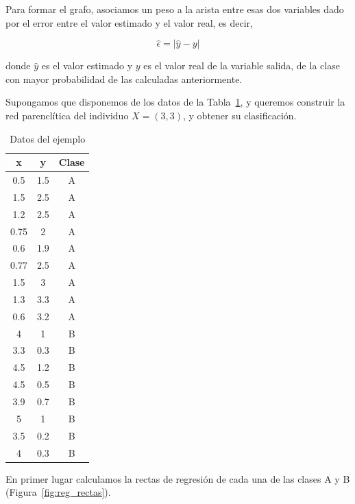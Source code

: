 Para formar el grafo, asociamos un peso a la arista entre esas dos variables dado por el error entre el valor estimado y el valor real, es decir,

\begin{equation}
\hat{\epsilon} = |\hat{y} - y|
\end{equation} 

donde $\hat{y}$ es el valor estimado y $y$ es el valor real de la variable salida, de la clase con mayor probabilidad de las calculadas anteriormente.\\

\begin{ejemplo}
	Supongamos que disponemos de los datos de la Tabla~\ref{tbl:ejemploredparenclitica}, y queremos construir la red parenclítica del individuo $X = (3,3)$, y obtener su clasificación.\\
	
	\begin{table}[htbp!]
		\centering
		\caption{Datos del ejemplo}
		\label{tbl:ejemploredparenclitica}
		\begin{tabular}{@{}ccc@{}}
			\toprule
			x    & y   & Clase \\ \midrule
			0.5  & 1.5 & A     \\
			1.5  & 2.5 & A     \\
			1.2  & 2.5 & A     \\
			0.75 & 2   & A     \\
			0.6  & 1.9 & A     \\
			0.77 & 2.5 & A     \\
			1.5  & 3   & A     \\
			1.3  & 3.3 & A     \\
			0.6  & 3.2 & A     \\
			4    & 1   & B     \\
			3.3  & 0.3 & B     \\
			4.5  & 1.2 & B     \\
			4.5  & 0.5 & B     \\
			3.9  & 0.7 & B     \\
			5    & 1   & B     \\
			3.5  & 0.2 & B     \\
			4    & 0.3 & B     \\ \bottomrule
		\end{tabular}
	\end{table}
	
	En primer lugar calculamos la rectas de regresión de cada una de las clases A y B (Figura~\ref{fig:reg_rectas}).\\
	

\end{ejemplo}
